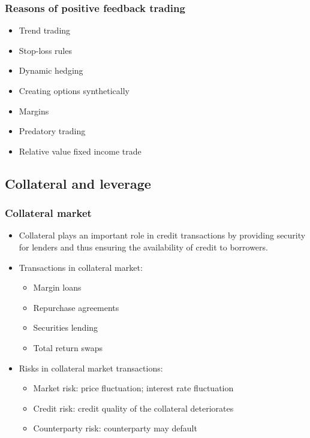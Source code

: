 \subsubsection{Reasons of positive feedback trading}
\begin{itemize}
    \item Trend trading
    \item Stop-loss rules
    \item Dynamic hedging
    \item Creating options synthetically
    \item Margins
    \item Predatory trading
    \item Relative value fixed income trade
\end{itemize}






\subsection{Collateral and leverage}

\subsubsection{Collateral market}
\begin{itemize}
\item Collateral plays an important role in credit transactions by providing security for lenders and thus ensuring the availability of credit to borrowers.
\item Transactions in collateral market:
    \begin{itemize}
    \item Margin loans
    \item Repurchase agreements
    \item Securities lending
    \item Total return swaps
    \end{itemize}
\item Risks in collateral market transactions:
    \begin{itemize}
    \item Market risk: price fluctuation; interest rate fluctuation
    \item Credit risk: credit quality of the collateral deteriorates
    \item Counterparty risk: counterparty may default
    \end{itemize}
\end{itemize}



